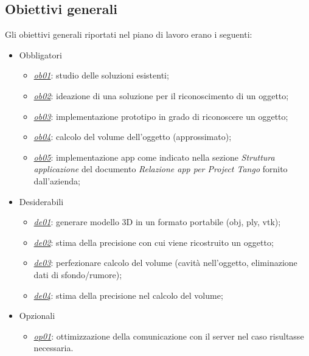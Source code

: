 \subsection{Obiettivi generali}
Gli obiettivi generali riportati nel piano di lavoro erano i seguenti:
\begin{itemize}
	\item Obbligatori
	\begin{itemize}
		\item \underline{\textit{ob01}}: studio delle soluzioni esistenti;
		\item \underline{\textit{ob02}}: ideazione di una soluzione per il riconoscimento di un oggetto;
		\item \underline{\textit{ob03}}: implementazione prototipo in grado di riconoscere un oggetto;
		\item \underline{\textit{ob04}}: calcolo del volume dell'oggetto (approssimato);
		\item \underline{\textit{ob05}}: implementazione app come indicato nella sezione \emph{Struttura applicazione} del documento \emph{Relazione app per Project Tango} fornito dall'azienda;
	\end{itemize}
	
	\item Desiderabili 
	\begin{itemize}
		\item \underline{\textit{de01}}: generare modello 3D in un formato portabile (obj, ply, vtk);
		\item \underline{\textit{de02}}: stima della precisione con cui viene ricostruito un oggetto;
		\item \underline{\textit{de03}}: perfezionare calcolo del volume (cavità nell'oggetto, eliminazione dati di sfondo/rumore);
		\item \underline{\textit{de04}}: stima della precisione nel calcolo del volume;
	\end{itemize}
	
	\item Opzionali
	\begin{itemize}
		\item \underline{\textit{op01}}: ottimizzazione della comunicazione con il server nel caso risultasse necessaria.
	\end{itemize} 
\end{itemize}

